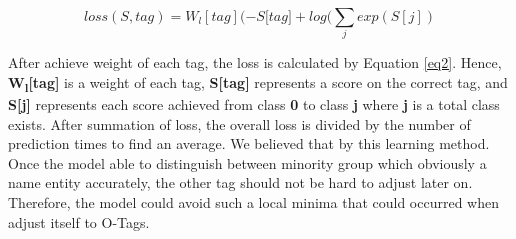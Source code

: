 \begin{CJK*}{UTF8}{min}
\begin{equation} \label{eq2}
\mathit{loss(S,tag)} = W_l[\mathit{tag}](- \mathit{S[tag}] + log(\sum_{\mathit{j}} \mathit{exp(S[j])}
\end{equation}

After achieve weight of each tag, the loss is calculated by Equation \ref{eq2}. 
Hence, \textbf{W\textsubscript{l}[tag]} is a weight of each tag, \textbf{S[tag]} represents a score on the correct tag, and \textbf{S[j]} represents each score achieved from class \textbf{0} to class \textbf{j} where \textbf{j} is a total class exists.
After summation of loss, the overall loss is divided by the number of prediction times to find an average. We believed that by this learning method. Once the model able to distinguish between minority group which obviously a name entity accurately, the other tag should not be hard to adjust later on. Therefore, the model could avoid such a local minima that could occurred when adjust itself to O-Tags.
\end{CJK*}